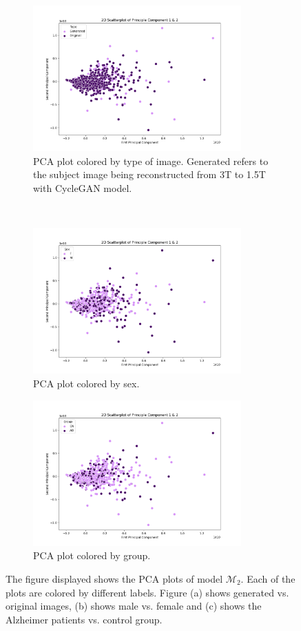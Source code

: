 \documentclass[11pt, fleqn, titlepage]{article}
\newcommand{\1}[1]{\mathds{1}\left[#1\right]}
\begin{document}
\begin{figure}[H]
	\centering
	\begin{subfigure}[t]{0.59\textwidth}
		\centering
		\includegraphics[height=2.2in]{imgs/classifier/overfit_with_generated_imgs_all_datapca_type}%
		\caption{PCA plot colored by type of image. Generated refers to the subject image being reconstructed from 3T to 1.5T with CycleGAN model.}
	\end{subfigure}%
	~
	\begin{subfigure}[t]{0.5\textwidth}
		\centering
		\includegraphics[height=2.2in]{imgs/classifier/overfit_with_generated_imgs_all_datapca_sex}%
		\caption{PCA plot colored by sex.}	
	\end{subfigure}
	\begin{subfigure}[t]{0.5\textwidth}
		\centering
		\includegraphics[height=2.2in]{imgs/classifier/overfit_with_generated_imgs_all_datapca_group}%
		\caption{PCA plot colored by group.}
	\end{subfigure}
	
	\caption{The figure displayed shows the PCA plots of model $ \mathcal M_2 $. Each of the plots are colored by different labels. Figure (a) shows generated vs. original images, (b) shows male vs. female and (c) shows the Alzheimer patients vs. control group. }
	\label{fig:pca_gen_overfit}
\end{figure}
\end{document}
